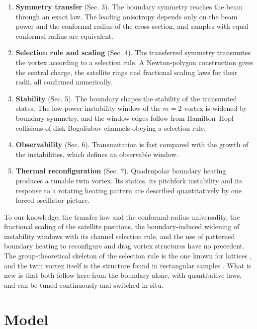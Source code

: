 \begin{enumerate}
\def\labelenumi{\arabic{enumi}.}
\tightlist
\item
  \textbf{Symmetry transfer} (Sec. 3). The boundary symmetry reaches the beam through an exact law. The leading anisotropy depends only on the beam power and the conformal radius of the cross-section, and samples with equal conformal radius are equivalent.
\item
  \textbf{Selection rule and scaling} (Sec. 4). The transferred symmetry transmutes the vortex according to a selection rule. A Newton-polygon construction gives the central charge, the satellite rings and fractional scaling laws for their radii, all confirmed numerically.
\item
  \textbf{Stability} (Sec. 5). The boundary shapes the stability of the transmuted states. The low-power instability window of the \(m = 2\) vortex is widened by boundary symmetry, and the window edges follow from Hamilton--Hopf collisions of disk Bogoliubov channels obeying a selection rule.
\item
  \textbf{Observability} (Sec. 6). Transmutation is fast compared with the growth of the instabilities, which defines an observable window.
\item
  \textbf{Thermal reconfiguration} (Sec. 7). Quadrupolar boundary heating produces a tunable twin vortex. Its statics, its pitchfork instability and its response to a rotating heating pattern are described quantitatively by one forced-oscillator picture.
\end{enumerate}

To our knowledge, the transfer law and the conformal-radius universality, the fractional scaling of the satellite positions, the boundary-induced widening of instability windows with its channel selection rule, and the use of patterned boundary heating to reconfigure and drag vortex structures have no precedent. The group-theoretical skeleton of the selection rule is the one known for lattices \citep{Ferrando2005vortex, Zacares2009}, and the twin vortex itself is the structure found in rectangular samples \citep{Ye2010twin}. What is new is that both follow here from the boundary alone, with quantitative laws, and can be tuned continuously and switched in situ.

\hypertarget{model}{%
\section{Model}\label{model}}

